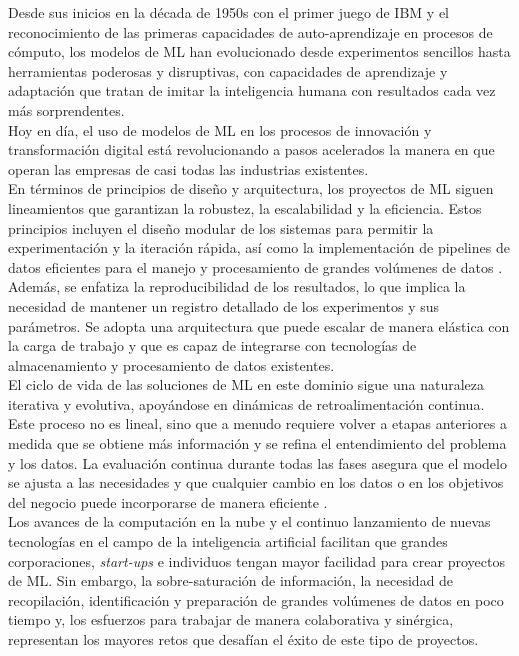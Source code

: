 \documentclass[journal]{IEEEtran}
\begin{document}
Desde sus inicios en la década de 1950s con el primer juego de IBM y el reconocimiento de las primeras capacidades de auto-aprendizaje en procesos de cómputo, los modelos de ML han evolucionado desde experimentos sencillos hasta herramientas poderosas y disruptivas, con capacidades de aprendizaje y adaptación que tratan de imitar la inteligencia humana con resultados cada vez más sorprendentes.\\

Hoy en día, el uso de modelos de ML en los procesos de innovación y transformación digital está revolucionando a pasos acelerados la manera en que operan las empresas de casi todas las industrias existentes.\\

En términos de principios de diseño y arquitectura, los proyectos de ML siguen lineamientos que garantizan la robustez, la escalabilidad y la eficiencia. Estos principios incluyen el diseño modular de los sistemas para permitir la experimentación y la iteración rápida, así como la implementación de pipelines de datos eficientes para el manejo y procesamiento de grandes volúmenes de datos \cite{10081336}. Además, se enfatiza la reproducibilidad de los resultados, lo que implica la necesidad de mantener un registro detallado de los experimentos y sus parámetros. Se adopta una arquitectura que puede escalar de manera elástica con la carga de trabajo y que es capaz de integrarse con tecnologías de almacenamiento y procesamiento de datos existentes.\\

El ciclo de vida de las soluciones de ML en este dominio sigue una naturaleza iterativa y evolutiva, apoyándose en dinámicas de retroalimentación continua. Este proceso no es lineal, sino que a menudo requiere volver a etapas anteriores a medida que se obtiene más información y se refina el entendimiento del problema y los datos. La evaluación continua durante todas las fases asegura que el modelo se ajusta a las necesidades y que cualquier cambio en los datos o en los objetivos del negocio puede incorporarse de manera eficiente \cite{10081336}.\\

Los avances de la computación en la nube y el continuo lanzamiento de nuevas tecnologías en el campo de la inteligencia artificial facilitan que grandes corporaciones, \textit{start-ups} e individuos tengan mayor facilidad para crear proyectos de ML. Sin embargo, la sobre-saturación de información, la necesidad de recopilación, identificación y preparación de grandes volúmenes de datos en poco tiempo y, los esfuerzos para trabajar de manera colaborativa y sinérgica, representan los mayores retos que desafían el éxito de este tipo de proyectos.\\
\end{document}
